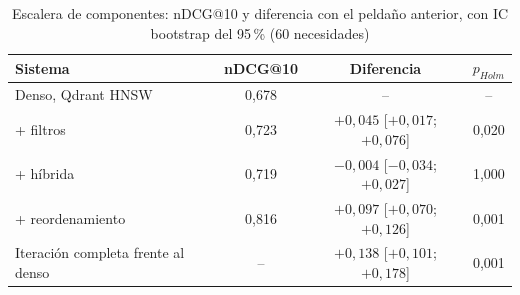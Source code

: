 \begin{table}[htbp!]
    \centering
    \caption{Escalera de componentes: nDCG@10 y diferencia con el peldaño anterior, con IC bootstrap del 95\,\% (60 necesidades)}
    \label{tab:res-escalera}
    \begin{tabular}{|l|c|c|c|}
        \hline
        \textbf{Sistema} & \textbf{nDCG@10} & \textbf{Diferencia} & \textbf{$p_{Holm}$} \\
        \hline
        Denso, Qdrant HNSW & 0{,}678 & -- & -- \\
        \hline
        + filtros & 0{,}723 & $+0{,}045$ [$+0{,}017$; $+0{,}076$] & 0{,}020 \\
        \hline
        + híbrida & 0{,}719 & $-0{,}004$ [$-0{,}034$; $+0{,}027$] & 1{,}000 \\
        \hline
        + reordenamiento & 0{,}816 & $+0{,}097$ [$+0{,}070$; $+0{,}126$] & 0{,}001 \\
        \hline
        Iteración completa frente al denso & -- & $+0{,}138$ [$+0{,}101$; $+0{,}178$] & 0{,}001 \\
        \hline
    \end{tabular}
\end{table}
